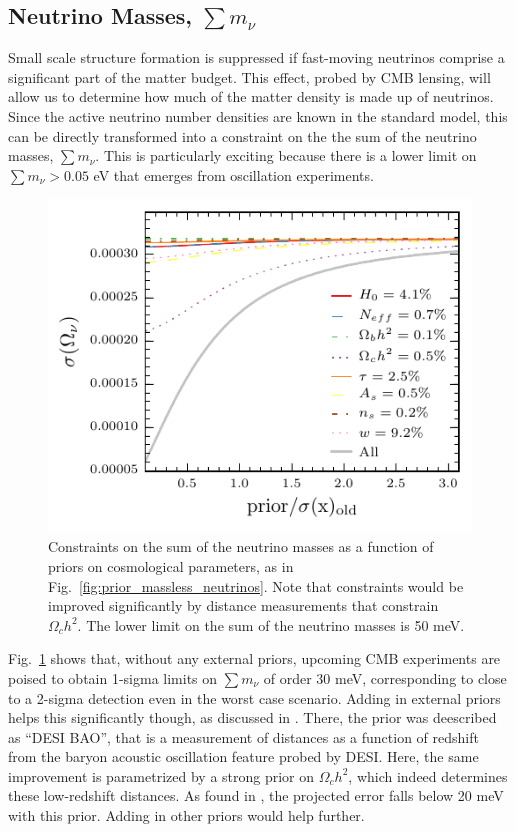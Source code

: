 \documentclass[aps,prd,reprint,superscriptaddress]{revtex4-1}
\newcommand{\reffig}[1]{Fig.~\ref{fig:#1}}
\begin{document}
\subsection{Neutrino Masses, $\sum m_\nu$}

Small scale structure formation is suppressed if fast-moving neutrinos comprise a significant part of the matter budget. This effect, probed by CMB lensing, will allow us to determine how much of the matter density is made up of neutrinos. Since the active neutrino number densities are known in the standard model, this can be directly transformed into a constraint on the the sum of the neutrino masses, $\sum m_\nu$. This is particularly exciting because there is a lower limit on $\sum m_\nu>0.05$ eV that emerges from oscillation experiments. 



\begin{figure}[htbp]
\begin{center}
\includegraphics{prior_omnuh2_snow_mass.pdf}
\caption{Constraints on the sum of the neutrino masses as a function of priors on cosmological parameters, as in \reffig{prior_massless_neutrinos}.  Note that constraints would be improved significantly  by distance measurements that constrain $\Omega_ch^2$. The lower limit on the sum of the neutrino masses is 50 meV.}
\label{fig:prior_omeganuh2}
\end{center}
\end{figure}


\reffig{prior_omeganuh2} shows that, without any external priors, upcoming CMB experiments are poised to obtain 1-sigma limits on $\sum m_\nu$ of order 30 meV, corresponding to close to a 2-sigma detection even in the worst case scenario. Adding in external priors helps this significantly though, as discussed in \citet{2013arXiv1309.5383A}. There, the prior was deescribed as ``DESI BAO'', that is a measurement of distances as a function of redshift from the baryon acoustic oscillation feature probed by DESI. Here, the same improvement is parametrized by a strong prior on $\Omega_ch^2$, which indeed determines these low-redshift distances. As found in \cite{2013arXiv1309.5383A}, the projected error falls below 20 meV with this prior. Adding in other priors would help further.
\end{document}
